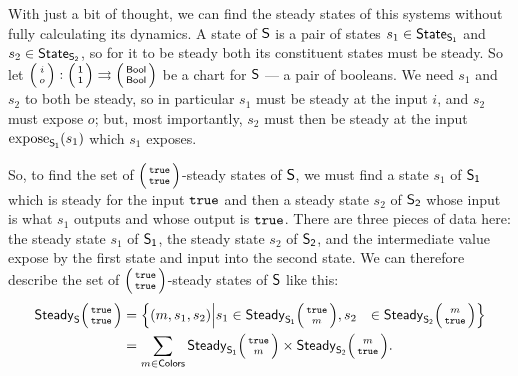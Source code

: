 \documentclass[DynamicalBook]{subfiles}
\begin{document}
With just a bit of thought, we can find the steady states of this systems without fully calculating its
dynamics. A state of $\mathsf{S}$ is a pair of states $s_1 \in  \mathsf{State}_{\mathsf{S_1}}$ and
$s_2 \in \mathsf{State}_{\mathsf{S_2}}$, so for it to be steady both its constituent states must be steady.
So let $\lens{i}{o} : \lens{\ord{1}}{\ord{1}} \tto
\lens{\Set{Bool}}{\Set{Bool}}$ be a chart for $\mathsf{S}$ --- a pair of booleans.
We need $s_1$ and $s_2$ to both be steady, so in particular $s_1$ must be steady
at the input $i$, and $s_2$ must expose $o$; but, most importantly, $s_2$ must then be steady at the input
$\mathrm{expose}_{\mathsf{S_1}}(s_1)$ which $s_1$ exposes.

So, to find the set of
$\lens{\true}{\true}$-steady states of $\mathsf{S}$, we must find a state $s_{1}$ of
$\mathsf{S_1}$ which is steady for the input $\mathtt{true}$ and then a steady state $s_{2}$ of
$\mathsf{S_2}$ whose input is what $s_{1}$ outputs and whose output is $\mathtt{true}$.
There are three pieces of data here: the steady state $s_{1}$ of $\mathsf{S_1}$, the steady state $s_{2}$ of
$\mathsf{S_2}$, and the intermediate value expose by the first state and input into
the second state. We can therefore describe the set of $\lens{\true}{\true}$-steady states of
$\mathsf{S}$ like this:
\begin{align*}
  \Set{Steady}_{\Sys{S}}\lens{\true}{\true} &= \left\{ (m, s_1, s_2)
  \middle| \begin{aligned}
    s_1 &\in \Set{Steady}_{\Sys{S_1}}\lens{\true}{m},
    s_2 &\in \Set{Steady}_{\Sys{S_2}}\lens{m}{\true}
  \end{aligned}\right\} \\
  &= \sum_{m \in \Set{Colors}} \Set{Steady}_{\Sys{S_1}} \lens{\true}{m} \times \Set{Steady}_{\Sys{S_2}}\lens{m}{\true}.
\end{align*}
\end{document}
